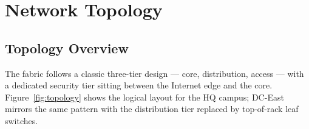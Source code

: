 \documentclass[11pt,a4paper]{report}
\begin{document}
\chapter{Network Topology}

\section{Topology Overview}
The fabric follows a classic three-tier design --- core, distribution, access --- with a
dedicated security tier sitting between the Internet edge and the core. Figure~\ref{fig:topology}
shows the logical layout for the HQ campus; DC-East mirrors the same pattern with the
distribution tier replaced by top-of-rack leaf switches.
\end{document}
